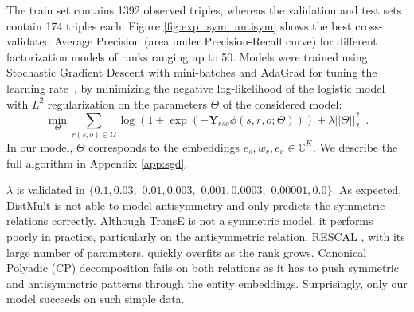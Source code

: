 \documentclass{article}
\newcommand{\complexSpace}{\mathbb{C}}
\newcommand{\C}{\complexSpace} %
\newcommand{\ObsTensor}{\mathbf{Y}}
\begin{document}
The train set contains 1392 observed triples, whereas the validation and test sets contain 174 triples each. Figure \ref{fig:exp_sym_antisym} shows the best cross-validated Average Precision (area under Precision-Recall curve) for different factorization models of ranks ranging up to 50. Models were trained using Stochastic Gradient Descent with mini-batches and AdaGrad for tuning the learning rate~\cite{duchi2011adaptive}, by minimizing the negative log-likelihood of the logistic model with $L^2$ regularization on the parameters $\Theta$ of the considered model:
\begin{equation}
    \min_{\Theta} \sum_{r(s,o) \in \Omega} \log( 1 + \exp(-\ObsTensor_{rso}\phi(s,r,o;\Theta))) + \lambda ||\Theta||^2_2\enspace.
\end{equation}
In our model, $\Theta$ corresponds to the embeddings $e_s,w_r,e_o \in \C^K$.
We describe the full algorithm in Appendix \ref{app:sgd}.

$\lambda$ is validated in $\{0.1, 0.03,$ $ 0.01, 0.003,$ $ 0.001, 0.0003,$ $ 0.00001, 0.0\}$. As expected, DistMult \cite{Yang2015} is not able to model antisymmetry and only predicts the symmetric relations correctly. Although TransE \cite{bordes2013translating} is not a symmetric model, it performs poorly in practice, particularly on the antisymmetric relation. 
RESCAL \cite{Nickel2011}, with its large number of parameters, quickly overfits as the rank grows. Canonical Polyadic (CP) decomposition \cite{hitchcock-sum-1927} fails on both relations as it has to push symmetric and antisymmetric patterns through the entity embeddings. Surprisingly, only our model succeeds on such simple data.
\end{document}
